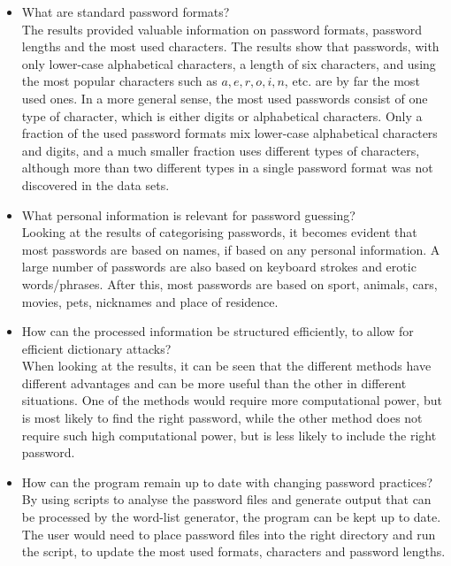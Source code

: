 \documentclass[a4paper,12pt]{article}
\begin{document}
\begin{itemize}
\item What are standard password formats?\\

  The results provided valuable information on password formats, password lengths and the most used characters. The results show that passwords, with only lower-case alphabetical characters, a length of six characters, and using the most popular characters such as $a,e,r,o,i,n$, etc. are by far the most used ones. In a more general sense, the most used passwords consist of one type of character, which is either digits or alphabetical characters. Only a fraction of the used password formats mix lower-case alphabetical characters and digits, and a much smaller fraction uses different types of characters, although more than two different types in a single password format was not discovered in the data sets.
  
\item What personal information is relevant for password guessing?\\

  Looking at the results of categorising passwords, it becomes evident that most passwords are based on names, if based on any personal information. A large number of passwords are also based on keyboard strokes and erotic words/phrases. After this, most passwords are based on sport, animals, cars, movies, pets, nicknames and place of residence.
  
\item How can the processed information be structured efficiently, to allow for efficient dictionary attacks?\\

  When looking at the results, it can be seen that the different methods have different advantages and can be more useful than the other in different situations. One of the methods would require more computational power, but is most likely to find the right password, while the other method does not require such high computational power, but is less likely to include the right password.

\item How can the program remain up to date with changing password practices?\\

  By using scripts to analyse the password files and generate output that can be processed by the word-list generator, the program can be kept up to date. The user would need to place password files into the right directory and run the script, to update the most used formats, characters and password lengths.
  
\end{itemize}
\end{document}
